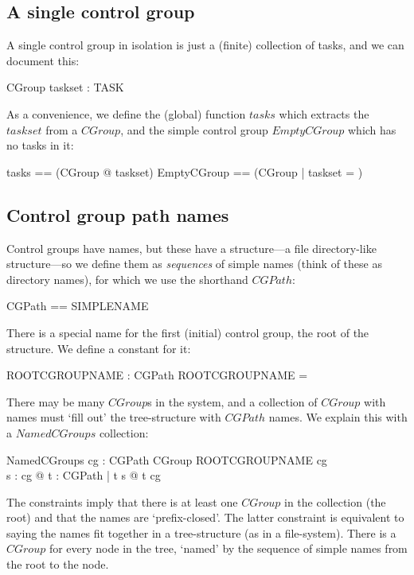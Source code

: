 \documentclass[a4paper,twoside,12pt]{article}
\begin{document}
\subsection{A single control group}

A single control group in isolation is just a (finite) collection of tasks, and we can document this:

\begin{schema}{CGroup}
taskset : \finset TASK
\end{schema}

As a convenience, we define the (global) function $tasks$ which extracts the $taskset$ from a $CGroup$, and the
simple control group $EmptyCGroup$ which has no tasks in it:
\begin{zed}
tasks == (\lambda CGroup @ taskset)
\also
EmptyCGroup == (\mu CGroup | taskset = \emptyset )
\end{zed}

\subsection{Control group path names}

Control groups have names, but these have a structure---a file directory-like structure---so we define them as \emph{sequences} of simple names (think of these as directory names), for which we use the shorthand $CGPath$:

\begin{zed}
CGPath == \seq SIMPLENAME
\end{zed}

There is a special name for the first (initial) control group, the root of the structure. We define a constant for it:

\begin{axdef}{}
ROOTCGROUPNAME : CGPath
\where
ROOTCGROUPNAME = \langle \rangle
\end{axdef}

There may be many $CGroup$s in the system, and a collection of $CGroup$ with names must `fill out' the tree-structure with $CGPath$ names. We explain this with a $NamedCGroups$ collection:

\begin{schema}{NamedCGroups}
cg : CGPath \ffun CGroup
\where
ROOTCGROUPNAME \in \dom cg \\
\forall s : \dom cg @ \forall t : CGPath | t \subset s @ t \in \dom cg
\end{schema}
The constraints imply that there is  at least one $CGroup$ in the collection (the root) and that the names are `prefix-closed'. The latter constraint is equivalent to saying the names fit together in a tree-structure (as in a file-system). 
There is a $CGroup$ for every node in the tree, `named' by the sequence of simple names from the root to the node.
\end{document}
